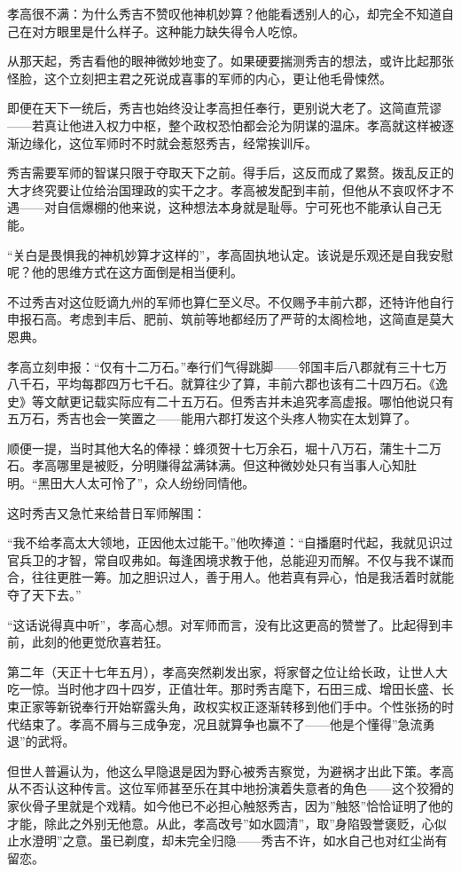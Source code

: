 \documentclass[
]{book}
\begin{document}
孝高很不满：为什么秀吉不赞叹他神机妙算？他能看透别人的心，却完全不知道自己在对方眼里是什么样子。这种能力缺失得令人吃惊。

从那天起，秀吉看他的眼神微妙地变了。如果硬要揣测秀吉的想法，或许比起那张怪脸，这个立刻把主君之死说成喜事的军师的内心，更让他毛骨悚然。

即便在天下一统后，秀吉也始终没让孝高担任奉行，更别说大老了。这简直荒谬------若真让他进入权力中枢，整个政权恐怕都会沦为阴谋的温床。孝高就这样被逐渐边缘化，这位军师时不时就会惹怒秀吉，经常挨训斥。

秀吉需要军师的智谋只限于夺取天下之前。得手后，这反而成了累赘。拨乱反正的大才终究要让位给治国理政的实干之才。孝高被发配到丰前，但他从不哀叹怀才不遇------对自信爆棚的他来说，这种想法本身就是耻辱。宁可死也不能承认自己无能。

``关白是畏惧我的神机妙算才这样的''，孝高固执地认定。该说是乐观还是自我安慰呢？他的思维方式在这方面倒是相当便利。

不过秀吉对这位贬谪九州的军师也算仁至义尽。不仅赐予丰前六郡，还特许他自行申报石高。考虑到丰后、肥前、筑前等地都经历了严苛的太阁检地，这简直是莫大恩典。

孝高立刻申报：``仅有十二万石。''奉行们气得跳脚------邻国丰后八郡就有三十七万八千石，平均每郡四万七千石。就算往少了算，丰前六郡也该有二十四万石。《逸史》等文献更记载实际应有二十五万石。但秀吉并未追究孝高虚报。哪怕他说只有五万石，秀吉也会一笑置之------能用六郡打发这个头疼人物实在太划算了。

顺便一提，当时其他大名的俸禄：蜂须贺十七万余石，堀十八万石，蒲生十二万石。孝高哪里是被贬，分明赚得盆满钵满。但这种微妙处只有当事人心知肚明。``黑田大人太可怜了''，众人纷纷同情他。

这时秀吉又急忙来给昔日军师解围：

``我不给孝高太大领地，正因他太过能干。''他吹捧道：``自播磨时代起，我就见识过官兵卫的才智，常自叹弗如。每逢困境求教于他，总能迎刃而解。不仅与我不谋而合，往往更胜一筹。加之胆识过人，善于用人。他若真有异心，怕是我活着时就能夺了天下去。''

``这话说得真中听''，孝高心想。对军师而言，没有比这更高的赞誉了。比起得到丰前，此刻的他更觉欣喜若狂。

第二年（天正十七年五月），孝高突然剃发出家，将家督之位让给长政，让世人大吃一惊。当时他才四十四岁，正值壮年。那时秀吉麾下，石田三成、增田长盛、长束正家等新锐奉行开始崭露头角，政权实权正逐渐转移到他们手中。个性张扬的时代结束了。孝高不屑与三成争宠，况且就算争也赢不了------他是个懂得''急流勇退''的武将。

但世人普遍认为，他这么早隐退是因为野心被秀吉察觉，为避祸才出此下策。孝高从不否认这种传言。这位军师甚至乐在其中地扮演着失意者的角色------这个狡猾的家伙骨子里就是个戏精。如今他已不必担心触怒秀吉，因为''触怒''恰恰证明了他的才能，除此之外别无他意。从此，孝高改号''如水圆清''，取''身陷毁誉褒贬，心似止水澄明''之意。虽已剃度，却未完全归隐------秀吉不许，如水自己也对红尘尚有留恋。
\end{document}
